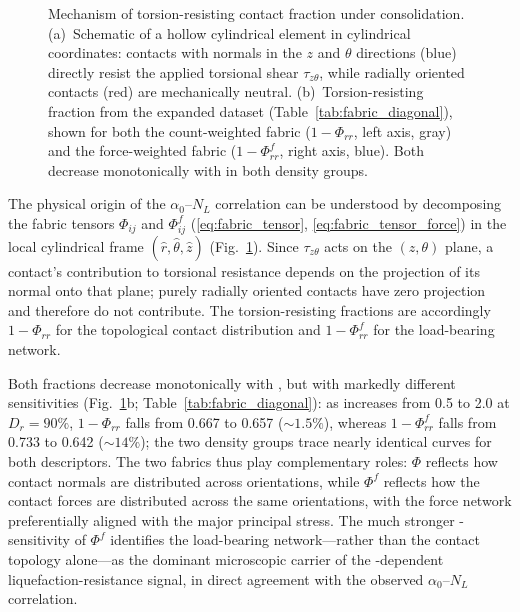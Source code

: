 \begin{figure}
  \centering
  \caption{Mechanism of torsion-resisting contact fraction under \Kzero{} consolidation. (a)~Schematic of a hollow cylindrical element in cylindrical coordinates: contacts with normals in the $z$ and $\theta$ directions (blue) directly resist the applied torsional shear $\tau_{z\theta}$, while radially oriented contacts (red) are mechanically neutral. (b)~Torsion-resisting fraction from the expanded dataset (Table~\ref{tab:fabric_diagonal}), shown for both the count-weighted fabric ($1-\Phi_{rr}$, left axis, gray) and the force-weighted fabric ($1-\Phi^f_{rr}$, right axis, blue). Both decrease monotonically with \Kzero{} in both density groups.}
  \label{fig:fabric_mechanism}
\end{figure}

The physical origin of the $\alpha_0$--$N_L$ correlation can be understood by decomposing the fabric tensors $\Phi_{ij}$ and $\Phi^f_{ij}$ (\eqref{eq:fabric_tensor}, \eqref{eq:fabric_tensor_force}) in the local cylindrical frame $(\hat{r},\hat{\theta},\hat{z})$ (Fig.~\ref{fig:fabric_mechanism}). Since $\tau_{z\theta}$ acts on the $(z,\theta)$ plane, a contact's contribution to torsional resistance depends on the projection of its normal onto that plane; purely radially oriented contacts have zero projection and therefore do not contribute. The torsion-resisting fractions are accordingly $1-\Phi_{rr}$ for the topological contact distribution and $1-\Phi^f_{rr}$ for the load-bearing network.

Both fractions decrease monotonically with \Kzero{}, but with markedly different sensitivities (Fig.~\ref{fig:fabric_mechanism}b; Table~\ref{tab:fabric_diagonal}): as \Kzero{} increases from 0.5 to 2.0 at $D_r = 90\%$, $1-\Phi_{rr}$ falls from 0.667 to 0.657 (${\sim}1.5\%$), whereas $1-\Phi^f_{rr}$ falls from 0.733 to 0.642 (${\sim}14\%$); the two density groups trace nearly identical curves for both descriptors. The two fabrics thus play complementary roles: $\Phi$ reflects how contact normals are distributed across orientations, while $\Phi^f$ reflects how the contact forces are distributed across the same orientations, with the force network preferentially aligned with the major principal stress. The much stronger \Kzero{}-sensitivity of $\Phi^f$ identifies the load-bearing network---rather than the contact topology alone---as the dominant microscopic carrier of the \Kzero{}-dependent liquefaction-resistance signal, in direct agreement with the observed $\alpha_0$--$N_L$ correlation.

